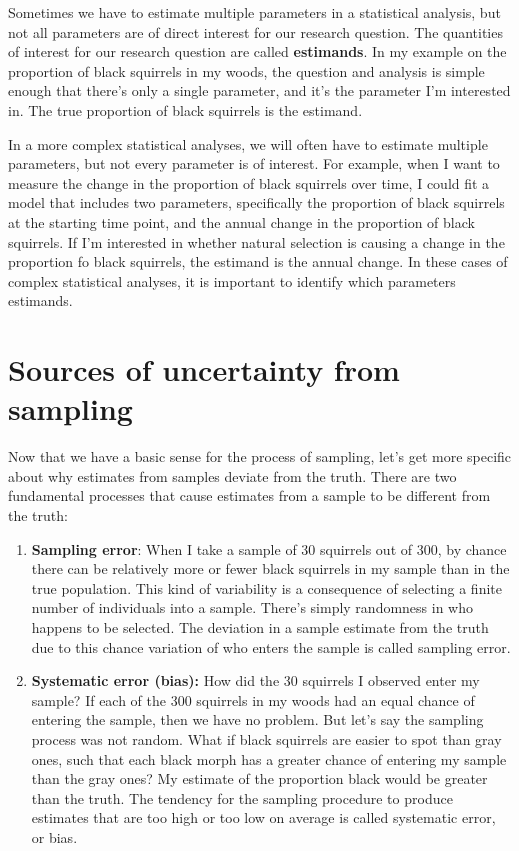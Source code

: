 \documentclass[
]{book}
\begin{document}
Sometimes we have to estimate multiple parameters in a statistical analysis, but not all parameters are of direct interest for our research question. The quantities of interest for our research question are called \textbf{estimands}. In my example on the proportion of black squirrels in my woods, the question and analysis is simple enough that there's only a single parameter, and it's the parameter I'm interested in. The true proportion of black squirrels is the estimand.

In a more complex statistical analyses, we will often have to estimate multiple parameters, but not every parameter is of interest. For example, when I want to measure the change in the proportion of black squirrels over time, I could fit a model that includes two parameters, specifically the proportion of black squirrels at the starting time point, and the annual change in the proportion of black squirrels. If I'm interested in whether natural selection is causing a change in the proportion fo black squirrels, the estimand is the annual change. In these cases of complex statistical analyses, it is important to identify which parameters estimands.

\section{Sources of uncertainty from sampling}\label{sources-of-uncertainty-from-sampling}

Now that we have a basic sense for the process of sampling, let's get more specific about why estimates from samples deviate from the truth. There are two fundamental processes that cause estimates from a sample to be different from the truth:

\begin{enumerate}
\def\labelenumi{\arabic{enumi}.}
\item
  \textbf{Sampling error}: When I take a sample of 30 squirrels out of 300, by chance there can be relatively more or fewer black squirrels in my sample than in the true population. This kind of variability is a consequence of selecting a finite number of individuals into a sample. There's simply randomness in who happens to be selected. The deviation in a sample estimate from the truth due to this chance variation of who enters the sample is called sampling error.
\item
  \textbf{Systematic error (bias):} How did the 30 squirrels I observed enter my sample? If each of the 300 squirrels in my woods had an equal chance of entering the sample, then we have no problem. But let's say the sampling process was not random. What if black squirrels are easier to spot than gray ones, such that each black morph has a greater chance of entering my sample than the gray ones? My estimate of the proportion black would be greater than the truth. The tendency for the sampling procedure to produce estimates that are too high or too low on average is called systematic error, or bias.
\end{enumerate}
\end{document}
